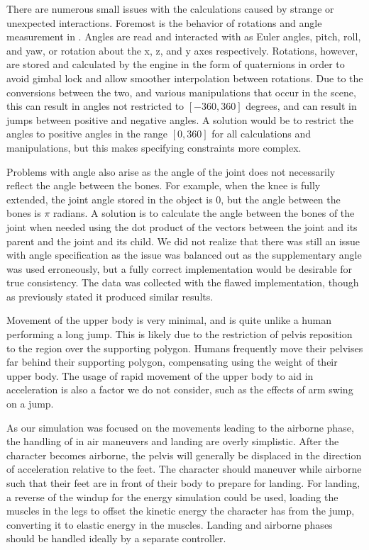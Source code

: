 There are numerous small issues with the calculations caused by strange or unexpected interactions.  Foremost is the behavior of rotations and angle measurement in \unity{}.  Angles are read and interacted with as Euler angles, pitch, roll, and yaw, or rotation about the x, z, and y axes respectively.  Rotations, however, are stored and calculated by the engine in the form of quaternions in order to avoid gimbal lock and allow smoother interpolation between rotations.  Due to the conversions between the two, and various manipulations that occur in the scene, this can result in angles not restricted to $[-360, 360]$ degrees, and can result in jumps between positive and negative angles.  A solution would be to restrict the angles to positive angles in the range $[0,360]$ for all calculations and manipulations, but this makes specifying constraints more complex.  

Problems with angle also arise as the angle of the joint does not necessarily reflect the angle between the bones.  For example, when the knee is fully extended, the joint angle stored in the object is 0, but the angle between the bones is $\pi$ radians.  A solution is to calculate the angle between the bones of the joint when needed using the dot product of the vectors between the joint and its parent and the joint and its child.  We did not realize that there was still an issue with angle specification as the issue was balanced out as the supplementary angle was used erroneously, but a fully correct implementation would be desirable for true consistency.  The data was collected with the flawed implementation, though as previously stated it produced similar results.

Movement of the upper body is very minimal, and is quite unlike a human performing a long jump.  This is likely due to the restriction of pelvis reposition to the region over the supporting polygon.  Humans frequently move their pelvises far behind their supporting polygon, compensating using the weight of their upper body.  The usage of rapid movement of the upper body to aid in acceleration is also a factor we do not consider, such as the effects of arm swing on a jump.

As our simulation was focused on the movements leading to the airborne phase, the handling of in air maneuvers and landing are overly simplistic.  After the character becomes airborne, the pelvis will generally be displaced in the direction of acceleration relative to the feet.  The character should maneuver while airborne such that their feet are in front of their body to prepare for landing.  For landing, a reverse of the windup for the energy simulation could be used, loading the muscles in the legs to offset the kinetic energy the character has from the jump, converting it to elastic energy in the muscles.  Landing and airborne phases should be handled ideally by a separate controller.

